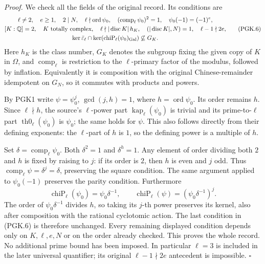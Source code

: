 \documentclass[11pt,a4paper]{article}
\numberwithin{equation}{section}
\theoremstyle{remark}\newtheorem{remark}[theorem]{Remark}
\begin{document}
\emph{Proof.}
We check all the fields of the original record. Its conditions are
\[
 \begin{gathered}
 \ell\ne2,\quad e\ge1,\quad 2\mid N,\quad
 \ell\nmid\operatorname{ord}\psi_0,\quad
       (\operatorname{comp}_\ell\psi_0)^2=1,\quad
       \psi_0(-1)=(-1)^e,\\
 [K:\mathbb Q]=2,\quad K\text{ totally complex},\quad
 \ell\nmid|\operatorname{disc}K|\,h_K,\quad
       (|\operatorname{disc}K|,N)=1,\quad \ell-1\nmid2e,\\
 \ker\bar\varepsilon_\ell\cap
     \ker(\operatorname{chiP}_\ell(\psi_0)_{\rm Gal})
                                      \not\subseteq G_K .
 \end{gathered}                                                  \tag{PGK.6}
\]
Here \(h_K\) is the class number, \(G_K\) denotes the subgroup
fixing the given copy of \(K\) in \(\Omega\), and
\(\operatorname{comp}_\ell\) is restriction to the
\(\ell\)-primary factor of the modulus, followed by inflation.
Equivalently it is composition with the original Chinese-remainder
idempotent on \(G_N\), so it commutes with products and powers.

By PGK1 write \(\psi=\psi_0^j\), \(\gcd(j,h)=1\), where
\(h=\operatorname{ord}\psi_0\). Its order remains \(h\).
Since \(\ell\nmid h\), the source's \(\ell\)-power part
\(\operatorname{kap}_\ell(\psi_0)\) is trivial and its
prime-to-\(\ell\) part \(\operatorname{th0}_\ell(\psi_0)\)
is \(\psi_0\); the same holds for \(\psi\). This also follows
directly from their defining exponents: the \(\ell\)-part of
\(h\) is \(1\), so the defining power is a multiple of \(h\).

Set \(\delta=\operatorname{comp}_\ell\psi_0\). Both
\(\delta^2=1\) and \(\delta^h=1\). Any element of order dividing
both \(2\) and \(h\) is fixed by raising to \(j\): if its order
is \(2\), then \(h\) is even and \(j\) odd. Thus
\(\operatorname{comp}_\ell\psi=\delta^j=\delta\), preserving
the square condition. The same argument applied to
\(\psi_0(-1)\) preserves the parity condition.
Furthermore
\[
 \operatorname{chiP}_\ell(\psi_0)=\psi_0\delta^{-1},\qquad
 \operatorname{chiP}_\ell(\psi)
                 =(\psi_0\delta^{-1})^j .                      \tag{PGK.7}
\]
The order of \(\psi_0\delta^{-1}\) divides \(h\), so taking
its \(j\)-th power preserves its kernel, also after composition
with the rational cyclotomic action. The last condition in
(PGK.6) is therefore unchanged. Every remaining displayed
condition depends only on \(K,\ell,e,N\) or on the order
already checked. This proves the whole record.
No additional prime bound has been imposed. In particular
\(\ell=3\) is included in the later universal quantifier;
its original \(\ell-1\nmid2e\) antecedent is impossible.
\hfill\(\square\)
\end{document}
